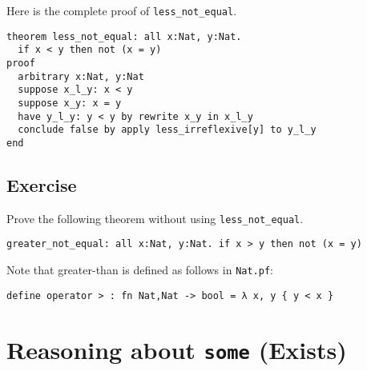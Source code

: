 \documentclass[12pt]{article}
\begin{document}
Here is the complete proof of \texttt{less\_not\_equal}.

\begin{verbatim}
theorem less_not_equal: all x:Nat, y:Nat.
  if x < y then not (x = y)
proof
  arbitrary x:Nat, y:Nat
  suppose x_l_y: x < y
  suppose x_y: x = y
  have y_l_y: y < y by rewrite x_y in x_l_y
  conclude false by apply less_irreflexive[y] to y_l_y
end
\end{verbatim}

\subsection{Exercise}

Prove the following theorem without using \texttt{less\_not\_equal}.

\begin{verbatim}
greater_not_equal: all x:Nat, y:Nat. if x > y then not (x = y)
\end{verbatim}

Note that greater-than is defined as follows in \texttt{Nat.pf}:

\begin{verbatim}
define operator > : fn Nat,Nat -> bool = λ x, y { y < x }
\end{verbatim}

\pagebreak

\section{Reasoning about \texttt{some} (Exists)}
\label{sec:exists}
\end{document}
